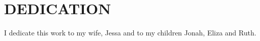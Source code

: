 \chapter*{DEDICATION}

I dedicate this work to my wife, Jessa and to my children Jonah, Eliza and Ruth.

